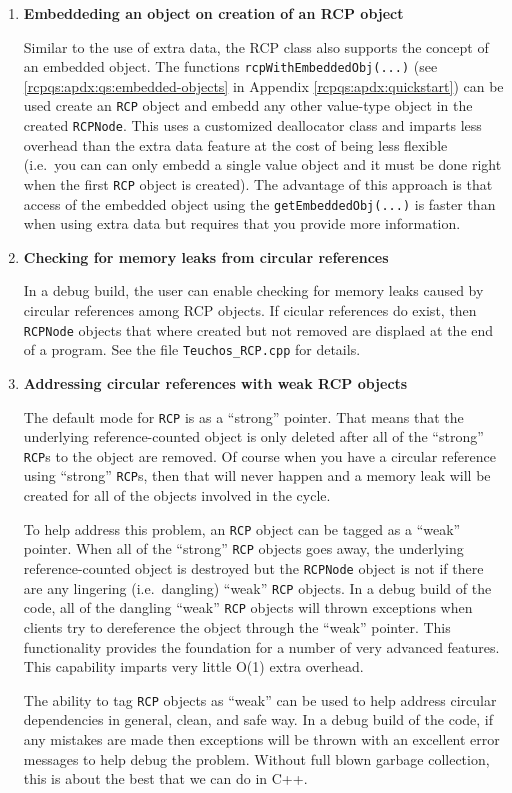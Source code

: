 \documentclass[pdf,ps2pdf,11pt]{SANDreport}
\begin{document}
\begin{enumerate}
\item \textbf{Embeddeding an object on creation of an RCP object}

Similar to the use of extra data, the RCP class also supports the concept of
an embedded object.  The functions
{}\texttt{rcp\-With\-Embedded\-Obj(...)} (see
{}\ref{rcpqs:apdx:qs:embedded-objects} in Appendix
{}\ref{rcpqs:apdx:quickstart}) can be used create an {}\texttt{RCP} object and
embedd any other value-type object in the created {}\texttt{RCPNode}.  This
uses a customized deallocator class and imparts less overhead than the extra
data feature at the cost of being less flexible (i.e.\ you can can only embedd
a single value object and it must be done right when the first {}\texttt{RCP}
object is created).  The advantage of this approach is that access of the
embedded object using the {}\texttt{get\-[Nonconst]\-Embedded\-Obj(...)} is
faster than when using extra data but requires that you provide more
information.

\item \textbf{Checking for memory leaks from circular references}

In a debug build, the user can enable checking for memory leaks caused
by circular references among RCP objects.  If cicular references do
exist, then {}\texttt{RCPNode} objects that where created but not
removed are displaed at the end of a program.  See the file
{}\texttt{Teuchos\-\_RCP.cpp} for details.

\item \textbf{Addressing circular references with weak RCP objects}

The default mode for {}\texttt{RCP} is as a ``strong'' pointer.  That
means that the underlying reference-counted object is only deleted
after all of the ``strong'' {}\texttt{RCP}s to the object are removed.
Of course when you have a circular reference using ``strong''
{}\texttt{RCP}s, then that will never happen and a memory leak will be
created for all of the objects involved in the cycle.

To help address this problem, an {}\texttt{RCP} object can be tagged
as a ``weak'' pointer.  When all of the ``strong'' {}\texttt{RCP}
objects goes away, the underlying reference-counted object is
destroyed but the {}\texttt{RCPNode} object is not if there are any
lingering (i.e.\ dangling) ``weak'' {}\texttt{RCP} objects.  In a
debug build of the code, all of the dangling ``weak'' {}\texttt{RCP}
objects will thrown exceptions when clients try to dereference the
object through the ``weak'' pointer.  This functionality provides the
foundation for a number of very advanced features.  This capability
imparts very little O(1) extra overhead.

The ability to tag {}\texttt{RCP} objects as ``weak'' can be used to
help address circular dependencies in general, clean, and safe way.
In a debug build of the code, if any mistakes are made then exceptions
will be thrown with an excellent error messages to help debug the
problem.  Without full blown garbage collection, this is about the
best that we can do in C++.


\end{enumerate}
\end{document}
